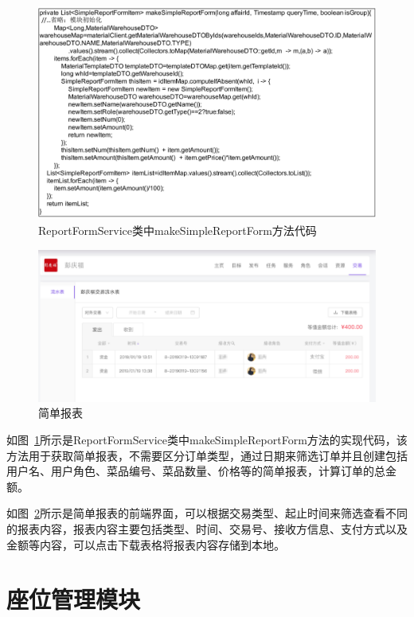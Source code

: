 \begin{figure}[htbp!]
    \centering
    \includegraphics[width=\linewidth]{FIGs/chapter4/7.pdf}
    \caption{ReportFormService类中makeSimpleReportForm方法代码}\label{fig_table_7}
\end{figure}

\begin{figure}[htbp!]
    \centering
    \includegraphics[width=\linewidth]{FIGs/chapter4/table_figure.pdf}
    \caption{简单报表}\label{fig_table_figure}
\end{figure}

如图~\ref{fig_table_7}所示是ReportFormService类中makeSimpleReportForm方法的实现代码，该方法用于获取简单报表，不需要区分订单类型，通过日期来筛选订单并且创建包括用户名、用户角色、菜品编号、菜品数量、价格等的简单报表，计算订单的总金额。

如图~\ref{fig_table_figure}所示是简单报表的前端界面，可以根据交易类型、起止时间来筛选查看不同的报表内容，报表内容主要包括类型、时间、交易号、接收方信息、支付方式以及金额等内容，可以点击下载表格将报表内容存储到本地。\\

\section{座位管理模块}
